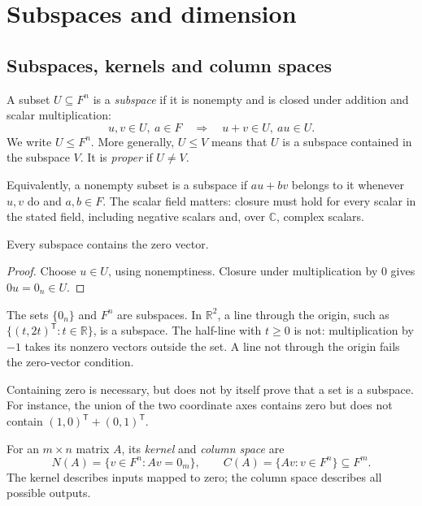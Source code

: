 \chapter{Subspaces and dimension}\label{chap:algebra-subspaces}

\section{Subspaces, kernels and column spaces}

\begin{definition}
A subset $U\subseteq F^n$ is a \emph{subspace} if it is nonempty and is
closed under addition and scalar multiplication:
\[
 u,v\in U,\ a\in F \quad\Longrightarrow\quad u+v\in U,\ au\in U.
\]
We write $U\leq F^n$. More generally, $U\leq V$ means that $U$ is a
subspace contained in the subspace $V$. It is \emph{proper} if $U\ne V$.
\end{definition}

Equivalently, a nonempty subset is a subspace if $au+bv$ belongs to it
whenever $u,v$ do and $a,b\in F$.
The scalar field matters: closure must hold for every scalar in the stated
field, including negative scalars and, over $\mathbb C$, complex scalars.

\begin{proposition}
Every subspace contains the zero vector.
\end{proposition}
\begin{proof}
Choose $u\in U$, using nonemptiness. Closure under multiplication by $0$
gives $0u=0_n\in U$.
\end{proof}

\begin{example}
The sets $\{0_n\}$ and $F^n$ are subspaces. In $\mathbb R^2$, a line
through the origin, such as $\{(t,2t)^{\mathsf T}:t\in\mathbb R\}$, is a
subspace. The half-line with $t\geq0$ is not: multiplication by $-1$
takes its nonzero vectors outside the set.
A line not through the origin fails the zero-vector condition.
\end{example}

\begin{remark}
Containing zero is necessary, but does not by itself prove that a set is a
subspace. For instance, the union of the two coordinate axes contains
zero but does not contain $(1,0)^{\mathsf T}+(0,1)^{\mathsf T}$.
\end{remark}

\begin{definition}
For an $m\times n$ matrix $A$, its \emph{kernel} and \emph{column space} are
\[
 N(A)=\{v\in F^n:Av=0_m\},\qquad
 C(A)=\{Av:v\in F^n\}\subseteq F^m.
\]
The kernel describes inputs mapped to zero; the column space describes
all possible outputs.
\end{definition}

